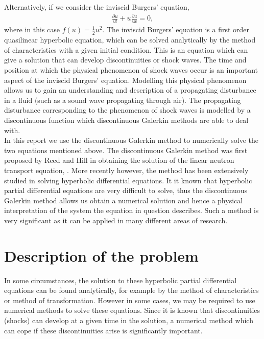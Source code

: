 \documentclass[a4paper, 12pt]{article}
\begin{document}
Alternatively, if we consider the inviscid Burgers' equation,
\begin{align*}
\frac{\partial u}{\partial t} + u\frac{\partial u}{\partial x} = 0,
\end{align*}  
where in this case $f(u) = \frac{1}{2}u^2$. The inviscid Burgers' equation is a first order quasilinear hyperbolic equation, which can be solved analytically by the method of characteristics with a given initial condition. This is an equation which can give a solution that can develop discontinuities or shock waves. The time and position at which the physical phenomenon of shock waves occur is an important aspect of the inviscid Burgers' equation. Modelling this physical phenomenon allows us to gain an understanding and description of a propagating disturbance in a fluid (such as a sound wave propagating through air). The propagating disturbance corresponding to the phenomenon of shock waves is modelled by a discontinuous function which discontinuous Galerkin methods are able to deal with.\\ 

In this report we use the discontinuous Galerkin method to numerically solve the two equations mentioned above. The discontinuous Galerkin method was first proposed by Reed and Hill in obtaining the solution of the linear neutron transport equation, \cite{ReedHill1973}. More recently however, the method has been extensively studied in solving hyperbolic differential equations. It it known that hyperbolic partial differential equations are very difficult to solve, thus the discontinuous Galerkin method allows us obtain a numerical solution and hence a physical interpretation of the system the equation in question describes. Such a method is very significant as it can be applied in many different areas of research.  

\newpage
\section{Description of the problem}
In some circumstances, the solution to these hyperbolic partial differential equations can be found analytically, for example by the method of characteristics or method of transformation. However in some cases, we may be required to use numerical methods to solve these equations. Since it is known that discontinuities (shocks) can develop at a given time in the solution, a numerical method which can cope if these discontinuities arise is significantly important. \\
\end{document}
